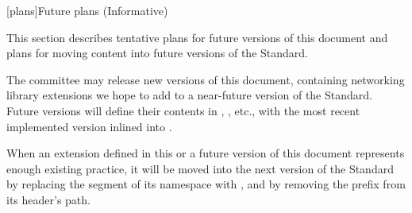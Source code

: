 
[plans]{Future plans (Informative)}

\pnum
This section describes tentative plans for future versions of this document
and plans for moving content into future versions of the \Cpp Standard.

\pnum
The \Cpp committee may release new versions of this document,
containing networking library extensions we hope to add to a near-future
version of the \Cpp Standard. Future versions will define their contents
in , ,
etc., with the most recent implemented version inlined into
.

\pnum
When an extension defined in this or a future version of this document
represents enough existing practice, it will be moved into
the next version of the \Cpp Standard by replacing the
 segment of its namespace with ,
and by removing the  prefix from its header's path.



